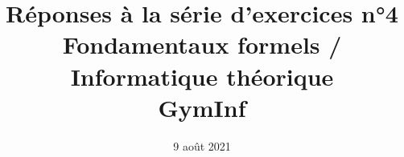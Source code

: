 \documentclass[12pt,french,a4paper]{article}
\begin{document}
\title{\vspace{-2cm}Réponses à la série d'exercices n°4\\\large{Fondamentaux formels / Informatique théorique\\GymInf}}
\date{\vspace{-1cm}9 août 2021}

\maketitle

\begin{question}

\end{question}


\begin{question}

\end{question}
\end{document}
